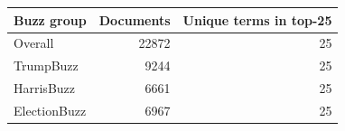 \begin{tabular}{lrr}
\toprule
Buzz group & Documents & Unique terms in top-25 \\
\midrule
Overall & 22872 & 25 \\
TrumpBuzz & 9244 & 25 \\
HarrisBuzz & 6661 & 25 \\
ElectionBuzz & 6967 & 25 \\
\bottomrule
\end{tabular}
